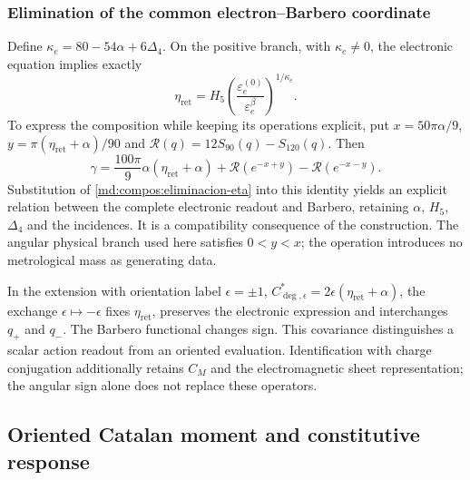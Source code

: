 \subsubsection{Elimination of the common electron--Barbero coordinate}
\label{md:compos:eliminacion}

Define $\kappa_e=80-54\alpha+6\Delta_4$. On the positive branch, with
$\kappa_e\neq0$, the electronic equation implies exactly
\begin{equation}
 \eta_{\mathrm{ret}}=H_5
 \left(\frac{\varepsilon_e^{(0)}}{\varepsilon_e^\beta}\right)^{1/\kappa_e}.
 \label{md:compos:eliminacion-eta}
\end{equation}
To express the composition while keeping its operations explicit, put
$x=50\pi\alpha/9$, $y=\pi(\eta_{\mathrm{ret}}+\alpha)/90$ and
$\mathcal R(q)=12S_{90}(q)-S_{120}(q)$. Then
\begin{equation}
 \gamma=\frac{100\pi}{9}\alpha(\eta_{\mathrm{ret}}+\alpha)
 +\mathcal R(e^{-x+y})-\mathcal R(e^{-x-y}).
 \label{md:compos:barbero-eta}
\end{equation}
Substitution of \eqref{md:compos:eliminacion-eta} into this identity yields
an explicit relation between the complete electronic readout and Barbero,
retaining $\alpha$, $H_5$, $\Delta_4$ and the incidences. It is a
compatibility consequence of the construction. The angular physical branch
used here satisfies $0<y<x$; the operation introduces no metrological mass
as generating data.

In the extension with orientation label $\epsilon=\pm1$,
$C^*_{\deg,\epsilon}=2\epsilon(\eta_{\mathrm{ret}}+\alpha)$, the exchange
$\epsilon\mapsto-\epsilon$ fixes $\eta_{\mathrm{ret}}$, preserves the
electronic expression and interchanges $q_+$ and $q_-$. The Barbero
functional changes sign. This covariance distinguishes a scalar action
readout from an oriented evaluation. Identification with charge conjugation
additionally retains $C_M$ and the electromagnetic sheet representation;
the angular sign alone does not replace these operators.

\subsection{Oriented Catalan moment and constitutive response}
\label{md:compos:catalan}

